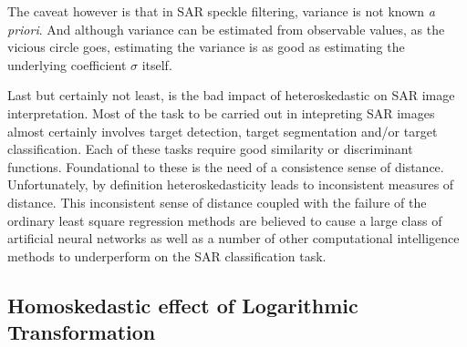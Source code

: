 \documentclass[journal]{IEEEtran}
\begin{document}
The caveat however is that in SAR speckle filtering, variance is not known \textit{a priori}. And although variance can be estimated from observable values, as the vicious circle goes, estimating the variance is as good as estimating the underlying coefficient $\sigma$ itself.


Last but certainly not least, is the bad impact of heteroskedastic on SAR image interpretation. Most of the task to be carried out in intepreting SAR images almost certainly involves target detection, target segmentation and/or target classification. Each of these tasks require good similarity or discriminant functions. Foundational to these is the need of a consistence sense of distance. Unfortunately, by definition heteroskedasticity leads to inconsistent measures of distance. This inconsistent sense of distance coupled with the failure of the ordinary least square regression methods are believed to cause a large class of artificial neural networks as well as a number of other computational intelligence methods to underperform on the SAR classification task.


\subsection{ Homoskedastic effect of Logarithmic Transformation }
\end{document}
